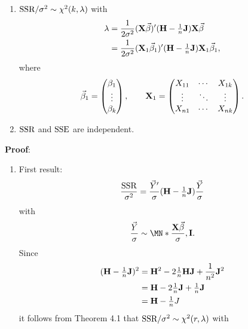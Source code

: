 \begin{Theorem}{}{}
    \begin{enumerate}[(1)]
        \item $ \text{SSR}/\sigma^2 \sim \chi^2(k,\lambda) $ with
              \begin{align*}
                  \lambda
                   & =\frac{1}{2\sigma^2}(\mathbf{X}\vec{\beta})'(\mathbf{H}-\tfrac{1}{n}\mathbf{J})\mathbf{X}\vec{\beta}            \\
                   & =\frac{1}{2\sigma^2}(\mathbf{X}_1 \vec{\beta}_1)'(\mathbf{H}-\tfrac{1}{n}\mathbf{J})\mathbf{X}_1 \vec{\beta}_1,
              \end{align*}
              where
              \[ \vec{\beta}_1=\begin{pmatrix}
                      \beta_1 \\
                      \vdots  \\
                      \beta_k
                  \end{pmatrix},\qquad \mathbf{X}_1=\begin{pmatrix}
                      X_{11} & \cdots & X_{1k} \\
                      \vdots & \ddots & \vdots \\
                      X_{n1} & \cdots & X_{nk}
                  \end{pmatrix}. \]
        \item $ \text{SSR} $ and $ \text{SSE} $ are independent.
    \end{enumerate}
    \tcblower{}
    \textbf{Proof}:
    \begin{enumerate}[(1)]
        \item First result:
              \[ \frac{\text{SSR}}{\sigma^2}=\frac{\vec{Y}'}{\sigma}(\mathbf{H}-\tfrac{1}{n}\mathbf{J})\frac{\vec{Y}}{\sigma} \]
              with
              \[ \frac{\Vector{Y}}{\sigma}\sim \MN*{\frac{\Matrix{X}\Vector{\beta}}{\sigma},\Matrix{I}}. \]
              Since
              \begin{align*}
                  (\mathbf{H}-\tfrac{1}{n}\mathbf{J})^2
                   & =\mathbf{H}^2-2 \tfrac{1}{n}\mathbf{H}\mathbf{J}+\frac{1}{n^2}\mathbf{J}^2 \\
                   & =\mathbf{H}-2\tfrac{1}{n}\mathbf{J}+\tfrac{1}{n}\mathbf{J}                 \\
                   & =\mathbf{H}-\tfrac{1}{n}J
              \end{align*}
              it follows from Theorem 4.1 that $ \text{SSR}/\sigma^2 \sim \chi^2(r,\lambda) $ with

\end{enumerate}
\end{Theorem}
